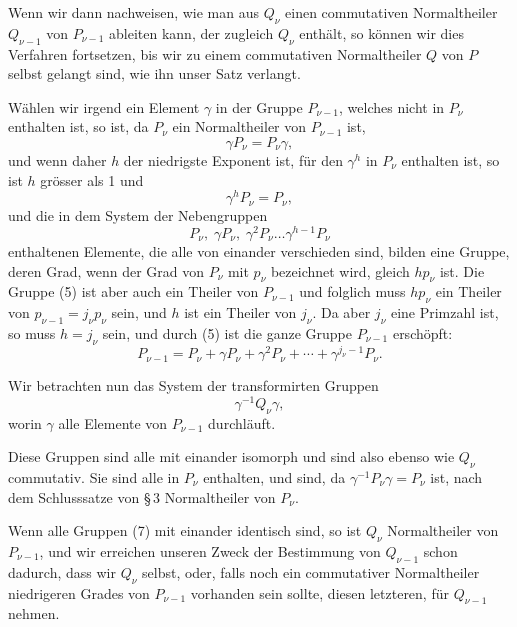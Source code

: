 \documentclass[11pt]{article}
\begin{document}
Wenn wir dann nachweisen, wie man aus $Q_\nu$ einen commutativen Normaltheiler $Q_{\nu-1}$ von $P_{\nu-1}$ ableiten kann, der zugleich $Q_\nu$ enthält, so können wir dies Verfahren fortsetzen, bis wir zu einem commutativen Normaltheiler $Q$ von $P$ selbst gelangt sind, wie ihn unser Satz verlangt.

Wählen wir irgend ein Element $\gamma$ in der Gruppe $P_{\nu-1}$, welches nicht in $P_\nu$ enthalten ist, so ist, da $P_\nu$ ein Normaltheiler von $P_{\nu-1}$ ist,
\begin{equation}
\gamma P_\nu=P_\nu\gamma,
\tag{3}
\end{equation}
und wenn daher $h$ der niedrigste Exponent ist, für den $\gamma^h$ in $P_\nu$ enthalten ist, so ist $h$ grösser als 1 und
\begin{equation}
\gamma^hP_\nu=P_\nu,
\tag{4}
\end{equation}
und die in dem System der Nebengruppen
\begin{equation}
P_\nu,\;\gamma P_\nu,\;\gamma^2P_\nu\ldots \gamma^{h-1}P_\nu
\tag{5}
\end{equation}
enthaltenen Elemente, die alle von einander verschieden sind, bilden eine Gruppe, deren Grad, wenn der Grad von $P_\nu$ mit $p_\nu$ bezeichnet wird, gleich $hp_\nu$ ist. Die Gruppe (5) ist aber auch ein Theiler von $P_{\nu-1}$ und folglich muss $hp_\nu$ ein Theiler von $p_{\nu-1}=j_\nu p_\nu$ sein, und $h$ ist ein Theiler von $j_\nu$. Da aber $j_\nu$ eine Primzahl ist, so muss $h=j_\nu$ sein, und durch (5) ist die ganze Gruppe $P_{\nu-1}$ erschöpft:
\begin{equation}
P_{\nu-1}=P_\nu+\gamma P_\nu+\gamma^2P_\nu+\cdots+\gamma^{j_\nu-1}P_\nu.
\tag{6}
\end{equation}

Wir betrachten nun das System der transformirten Gruppen
\begin{equation}
\gamma^{-1}Q_\nu\gamma,
\tag{7}
\end{equation}
worin $\gamma$ alle Elemente von $P_{\nu-1}$ durchläuft.

Diese Gruppen sind alle mit einander isomorph und sind also ebenso wie $Q_\nu$ commutativ. Sie sind alle in $P_\nu$ enthalten, und sind, da $\gamma^{-1}P_\nu\gamma=P_\nu$ ist, nach dem Schlusssatze von \S\,3 Normaltheiler von $P_\nu$.

Wenn alle Gruppen (7) mit einander identisch sind, so ist $Q_\nu$ Normaltheiler von $P_{\nu-1}$, und wir erreichen unseren Zweck der Bestimmung von $Q_{\nu-1}$ schon dadurch, dass wir $Q_\nu$ selbst, oder, falls noch ein commutativer Normaltheiler niedrigeren Grades von $P_{\nu-1}$ vorhanden sein sollte, diesen letzteren, für $Q_{\nu-1}$ nehmen.
\end{document}
